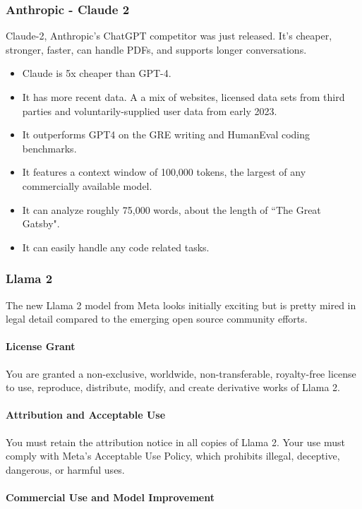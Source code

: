 \subsubsection{Anthropic - Claude 2}
Claude-2, Anthropic's ChatGPT competitor was just released. It's cheaper, stronger, faster, can handle PDFs, and supports longer conversations.
\begin{itemize}
\item Claude is 5x cheaper than GPT-4.

\item It has more recent data. A a mix of websites, licensed data sets from third parties and voluntarily-supplied user data from early 2023.

\item It outperforms GPT4 on the GRE writing and HumanEval coding benchmarks.

\item It features a context window of 100,000 tokens, the largest of any commercially available model.

\item It can analyze roughly 75,000 words, about the length of “The Great Gatsby".

\item It can easily handle any code related tasks.
\end{itemize}

\subsubsection{Llama 2}
The new Llama 2 model from Meta looks initially exciting but is pretty mired in legal detail compared to the emerging open source community efforts.
\paragraph{License Grant}

You are granted a non-exclusive, worldwide, non-transferable, royalty-free license to use, reproduce, distribute, modify, and create derivative works of Llama 2.
\paragraph{Attribution and Acceptable Use}

You must retain the attribution notice in all copies of Llama 2.
Your use must comply with Meta's Acceptable Use Policy, which prohibits illegal, deceptive, dangerous, or harmful uses.
\paragraph{Commercial Use and Model Improvement}

